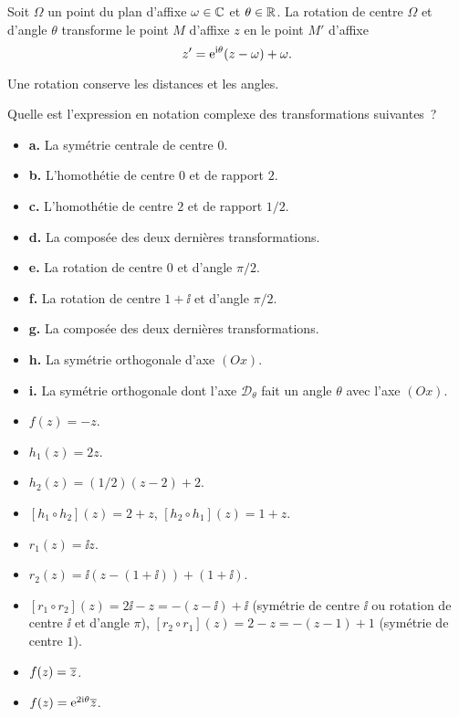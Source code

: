 \documentclass{magnolia}
\begin{document}
\begin{proposition}
Soit $\Omega$ un point du plan d'affixe $\omega\in\mathbb{C}$ et $\theta\in\mathbb{R}$. La rotation de centre $\Omega$ et d'angle $\theta$ transforme le point $M$ d'affixe $z$ en le point $M'$ d'affixe
\[z'={\rm e}^{{\rm i}\theta}(z-\omega)+\omega.\]
\end{proposition}

\begin{remarqueUnique}
\remarque Une rotation conserve les distances et les angles.
\end{remarqueUnique}

\begin{exoUnique}
\exo Quelle est l'expression en notation complexe des transformations suivantes~?
\begin{itemize}
\item \textbf{a.} La symétrie centrale de centre $0$.
\item \textbf{b.} L'homothétie de centre $0$ et de rapport $2$.
\item \textbf{c.} L'homothétie de centre $2$ et de rapport $1/2$.
\item \textbf{d.} La composée des deux dernières transformations.
\item \textbf{e.} La rotation de centre $0$ et d'angle $\pi/2$.
\item \textbf{f.} La rotation de centre $1+\ii$ et d'angle $\pi/2$.
\item \textbf{g.} La composée des deux dernières transformations.
\item \textbf{h.} La symétrie orthogonale d'axe $(Ox)$.
\item \textbf{i.} La symétrie orthogonale dont l'axe $\mathcal{D}_\theta$ fait un angle $\theta$ avec l'axe $(Ox)$.
\end{itemize}
\begin{sol}
\begin{itemize}
\item $f(z)=-z$.
\item $h_1(z)=2z$.
\item $h_2(z)=(1/2)(z-2)+2$.
\item $[h_1\circ h_2](z)=2+z$, $[h_2\circ h_1](z)=1+z$.
\item $r_1(z)=\ii z$.
\item $r_2(z)=\ii(z-(1+\ii))+(1+\ii)$.
\item $[r_1\circ r_2](z)=2\ii-z=-(z-\ii)+\ii$ (symétrie de centre $\ii$ ou rotation de centre $\ii$ et d'angle $\pi$), $[r_2\circ r_1](z)=2-z=-(z-1)+1$ (symétrie de centre $1$).
\item $f(z)=\overline{z}$.
\item $f(z)={\rm e}^{2{\rm i}\theta}\overline{z}$.
\end{itemize}
\end{sol}
\end{exoUnique}
\end{document}
